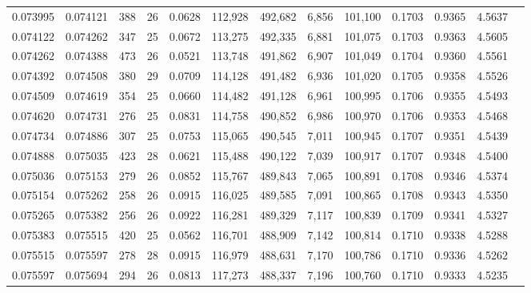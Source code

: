 \begin{tabular}{rrrrrrrrrrrrr}
0.073995 & 0.074121 & 388 &  26 &                                     0.0628 & 112,928 & 492,682 &   6,856 & 101,100 & 0.1703 & 0.9365 & 4.5637 \\
0.074122 & 0.074262 & 347 &  25 &                                     0.0672 & 113,275 & 492,335 &   6,881 & 101,075 & 0.1703 & 0.9363 & 4.5605 \\
0.074262 & 0.074388 & 473 &  26 &                                     0.0521 & 113,748 & 491,862 &   6,907 & 101,049 & 0.1704 & 0.9360 & 4.5561 \\
0.074392 & 0.074508 & 380 &  29 &                                     0.0709 & 114,128 & 491,482 &   6,936 & 101,020 & 0.1705 & 0.9358 & 4.5526 \\
0.074509 & 0.074619 & 354 &  25 &                                     0.0660 & 114,482 & 491,128 &   6,961 & 100,995 & 0.1706 & 0.9355 & 4.5493 \\
0.074620 & 0.074731 & 276 &  25 &                                     0.0831 & 114,758 & 490,852 &   6,986 & 100,970 & 0.1706 & 0.9353 & 4.5468 \\
0.074734 & 0.074886 & 307 &  25 &                                     0.0753 & 115,065 & 490,545 &   7,011 & 100,945 & 0.1707 & 0.9351 & 4.5439 \\
0.074888 & 0.075035 & 423 &  28 &                                     0.0621 & 115,488 & 490,122 &   7,039 & 100,917 & 0.1707 & 0.9348 & 4.5400 \\
0.075036 & 0.075153 & 279 &  26 &                                     0.0852 & 115,767 & 489,843 &   7,065 & 100,891 & 0.1708 & 0.9346 & 4.5374 \\
0.075154 & 0.075262 & 258 &  26 &                                     0.0915 & 116,025 & 489,585 &   7,091 & 100,865 & 0.1708 & 0.9343 & 4.5350 \\
0.075265 & 0.075382 & 256 &  26 &                                     0.0922 & 116,281 & 489,329 &   7,117 & 100,839 & 0.1709 & 0.9341 & 4.5327 \\
0.075383 & 0.075515 & 420 &  25 &                                     0.0562 & 116,701 & 488,909 &   7,142 & 100,814 & 0.1710 & 0.9338 & 4.5288 \\
0.075515 & 0.075597 & 278 &  28 &                                     0.0915 & 116,979 & 488,631 &   7,170 & 100,786 & 0.1710 & 0.9336 & 4.5262 \\
0.075597 & 0.075694 & 294 &  26 &                                     0.0813 & 117,273 & 488,337 &   7,196 & 100,760 & 0.1710 & 0.9333 & 4.5235 \\

\end{tabular}
